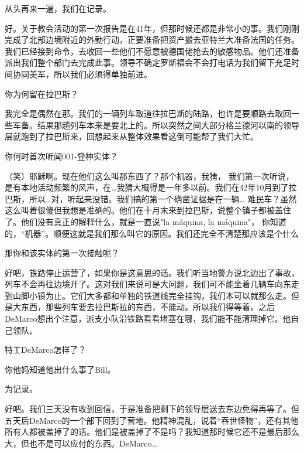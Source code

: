 \begin{scpbox}

从头再来一遍，我们在记录。

好。关于教会活动的第一次报告是在41年，但那时候还都是非常小的事。我们刚刚完成了北部边境附近的外勤行动，正要准备把资产搬去亚特兰大准备法国的任务。我们已经接到命令，去收回一些他们不愿意被德国佬抢去的敏感物品。他们还准备派出我们整个部门去完成此事。领导不确定罗斯福会不会打电话为我们留下充足时间协同美军，所以我们必须得单独前进。

你为何留在拉巴斯？

我完全是偶然在那。我们的一辆列车取道往拉巴斯的陆路，也许是要顺路去取回一些军备。结果那趟列车本来是要北上的。所以突然之间大部分格兰德河以南的领导层就跑到了拉巴斯来，回想起来从整体效果看这倒可能帮了我们大忙。

你何时首次听闻001-登神实体？

（笑）耶稣啊。现在他们这么叫那东西了？那个机器，我猜， 我们第一次听说，是有本地活动频繁的风声，在…我猜大概得是一年多以前。我们在42年10月到了拉巴斯，所以…对，听起来没错。我们搞的第一个确凿证据是在一辆… 难民车？虽然这么叫着很傻但我想是准确的。他们在十月末来到拉巴斯，说整个镇子都被盖住了。他们没有真正的解释什么，就是一直说"la máquina, la máquina"， 你知道的，“机器”。顺便这就是我们那么叫它的原因。我们还完全不清楚那应该是个什么

那你和该实体的第一次接触呢？

好吧，铁路停止运营了，如果你是这意思的话。我们听当地警方说北边出了事故，列车不会再往边境开了。这对我们来说可是大问题，我们可不能坐着几辆车向东走到山脚小镇为止。它们大多都和单独的铁道线完全挂钩，我们本可以就那么走。但是大东西，那些列车要去拉巴斯拉的东西，不能动。所以我们得等着。之后DeMarco想出个注意，派支小队沿铁路看看堵塞在哪，我们能不能清理掉它。他自己领队。

特工DeMarco怎样了？

你他妈知道他出什么事了Bill。

为记录。

好吧。我们三天没有收到回信，于是准备把剩下的领导层送去东边免得再等了。但五天后DeMarco的一个部下回到了营地。他精神混乱，说着“吞世怪物”，还有其他所有人都被盖掉了的话。他们是被盖掉了不是吗？我知道那时候它还不是最后那么大，但也不是可以应付的东西。DeMarco…


\end{scpbox}
